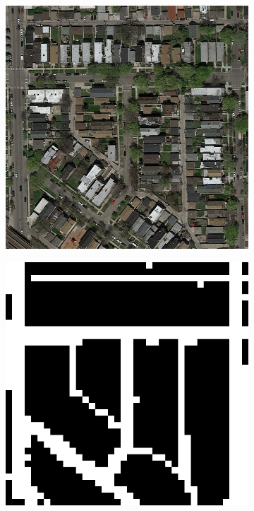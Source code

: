 \documentclass[10pt,conference,compsocconf]{IEEEtran}
\begin{document}
\begin{figure}
	\centering
	\begin{subfigure}[b]{0.15\textwidth}
	\includegraphics[width=\textwidth]{images/visualize_pred/test_10.png}
	\end{subfigure}
	\begin{subfigure}[b]{0.15\textwidth}
		\includegraphics[width=\textwidth]{images/visualize_pred/pred_10.png}

\end{subfigure}
\end{figure}
\end{document}

